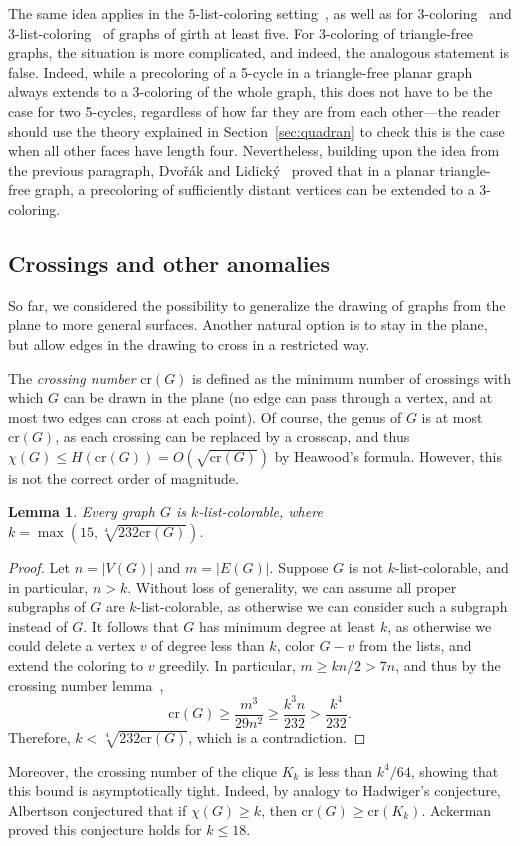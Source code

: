\documentclass[12pt,twoside,openright,a4paper]{book}
\newtheorem{lemma}[theorem]{Lemma}
\newcommand{\crs}{\text{cr}}
\begin{document}
The same idea applies in the $5$-list-coloring setting~\cite{lukethe}, as well as for 3-coloring~\cite{trfree3} and 3-list-coloring~\cite{postle3crit}
of graphs of girth at least five.  For 3-coloring of triangle-free graphs, the situation is more complicated, and indeed, the analogous statement
is false.  Indeed, while a precoloring of a 5-cycle in a triangle-free planar graph always extends to a 3-coloring of the whole
graph, this does not have to be the case for two 5-cycles, regardless of how far they are from each other---the reader should
use the theory explained in Section~\ref{sec:quadran} to check this is the case when all other faces have length four.
Nevertheless, building upon the idea from the previous paragraph, Dvo\v{r}\'ak and Lidick{\'y}~\cite{cylgen-part2} proved that
in a planar triangle-free graph, a precoloring of sufficiently distant vertices can be extended to a $3$-coloring.

\subsection{Crossings and other anomalies}

So far, we considered the possibility to generalize the drawing of graphs from the plane to more general surfaces.
Another natural option is to stay in the plane, but allow edges in the drawing to cross in a restricted way.

The \emph{crossing number} $\crs(G)$ is defined as the minimum number of crossings with which $G$ can be drawn in the plane
(no edge can pass through a vertex, and at most two edges can cross at each point).  Of course, the genus of $G$ is
at most $\crs(G)$, as each crossing can be replaced by a crosscap, and thus $\chi(G)\le H(\crs(G))=O(\sqrt{\crs(G)})$
by Heawood's formula.  However, this is not the correct order of magnitude.
\begin{lemma}
Every graph $G$ is $k$-list-colorable, where $k=\max(15,\sqrt[4]{232\crs(G)})$.
\end{lemma}
\begin{proof}
Let $n=|V(G)|$ and $m=|E(G)|$.  Suppose $G$ is not $k$-list-colorable, and in particular, $n>k$.
Without loss of generality, we can assume all proper subgraphs of $G$ are $k$-list-colorable,
as otherwise we can consider such a subgraph instead of $G$.  It follows that $G$ has minimum degree at least $k$,
as otherwise we could delete a vertex $v$ of degree less than $k$, color $G-v$ from the lists, and extend the coloring to $v$ greedily.
In particular, $m\ge kn/2>7n$, and thus by the crossing number lemma~\cite{ackerman2019topological},
$$\crs(G)\ge \frac{m^3}{29n^2}\ge\frac{k^3n}{232}>\frac{k^4}{232}.$$
Therefore, $k<\sqrt[4]{232\crs(G)}$, which is a contradiction.
\end{proof}
Moreover, the crossing number of the clique $K_k$ is less than $k^4/64$, showing that this bound is asymptotically tight.
Indeed, by analogy to Hadwiger's conjecture, Albertson conjectured that if $\chi(G)\ge k$, then $\crs(G)\ge \crs(K_k)$.
Ackerman~\cite{ackerman2019topological} proved this conjecture holds for $k\le 18$.
\end{document}
